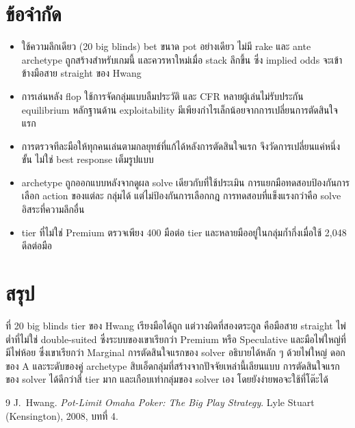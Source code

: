 \documentclass[11pt]{article}
\begin{document}
\begin{table}[H]
\centering
\caption{การจัดกลุ่มแต่ละแบบเลียนแบบการตัดสินใจแรกของ solver ได้ดีแค่ไหน}
\small
\resizebox{\linewidth}{!}{}
\end{table}

\section{ข้อจำกัด}
\begin{itemize}
\item ใช้ความลึกเดียว (20 big blinds) bet ขนาด pot อย่างเดียว ไม่มี rake และ ante archetype ถูกสร้างสำหรับเกมนี้
และควรหาใหม่เมื่อ stack ลึกขึ้น ซึ่ง implied odds จะเข้าข้างมือสาย straight ของ Hwang
\item การเล่นหลัง flop ใช้การจัดกลุ่มแบบลืมประวัติ และ CFR หลายผู้เล่นไม่รับประกัน equilibrium หลักฐานด้าน
exploitability มีเพียงกำไรเล็กน้อยจากการเปลี่ยนการตัดสินใจแรก
\item การตรวจทีละมือให้ทุกคนเล่นตามกลยุทธ์ที่แก้ได้หลังการตัดสินใจแรก จึงวัดการเปลี่ยนแค่หนึ่งขั้น ไม่ใช่ best response เต็มรูปแบบ
\item archetype ถูกออกแบบหลังจากดูผล solve เดียวกับที่ใช้ประเมิน การแยกมือทดสอบป้องกันการเลือก action ของแต่ละ
กลุ่มได้ แต่ไม่ป้องกันการเลือกกฎ การทดสอบที่แข็งแรงกว่าคือ solve อิสระที่ความลึกอื่น
\item tier ที่ไม่ใช่ Premium ตรวจเพียง 400 มือต่อ tier และหลายมืออยู่ในกลุ่มก้ำกึ่งเมื่อใช้ 2{,}048 ดีลต่อมือ
\end{itemize}

\section{สรุป}
ที่ 20 big blinds tier ของ Hwang เรียงมือได้ถูก แต่วางผิดที่สองตระกูล คือมือสาย straight ไพ่ต่ำที่ไม่ใช่ double-suited
ซึ่งระบบของเขาเรียกว่า Premium หรือ Speculative และมือไพ่ใหญ่ที่มีไพ่ห้อย ซึ่งเขาเรียกว่า Marginal การตัดสินใจแรกของ
solver อธิบายได้หลัก ๆ ด้วยไพ่ใหญ่ ดอกของ A และระดับของคู่ archetype สิบเอ็ดกลุ่มที่สร้างจากปัจจัยเหล่านี้เลียนแบบ
การตัดสินใจแรกของ solver ได้ดีกว่าสี่ tier มาก และเกือบเท่ากลุ่มของ solver เอง โดยยังง่ายพอจะใช้ที่โต๊ะได้

\begin{thebibliography}{9}
 J.~Hwang. \emph{Pot-Limit Omaha Poker: The Big Play Strategy}. Lyle Stuart
(Kensington), 2008, บทที่ 4.
\end{thebibliography}
\end{document}
